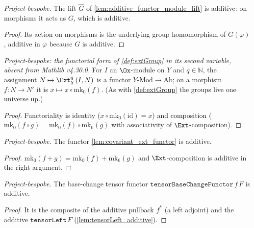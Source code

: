 \begin{lemma}
  \label{lem:lift_additive}
  \textit{Project-bespoke.}
  The lift $\widehat G$ of \cref{lem:additive_functor_module_lift} is additive: on
  morphisms it acts as $G$, which is additive.
  \begin{proof}
    Its action on morphisms is the underlying group homomorphism of $G(\varphi)$,
    additive in $\varphi$ because $G$ is additive.
  \end{proof}
\end{lemma}

\begin{lemma}
  \label{lem:covariant_ext_functor}
  \textit{Project-bespoke: the functorial form of \cref{def:extGroup} in its second
  variable, absent from Mathlib v4.30.0.}
  For $I$ an $\Ox$-module on $Y$ and $q \in \mathbb{N}$, the assignment
  $N \mapsto \Ext^q_Y(I, N)$ is a functor $Y\text{-Mod} \to \mathrm{Ab}$; on a
  morphism $f : N \to N'$ it is $x \mapsto x \circ \mathrm{mk}_0(f)$. (As with
  \cref{def:extGroup} the groups live one universe up.)
  \begin{proof}
    Functoriality is identity ($x\circ\mathrm{mk}_0(\mathrm{id}) = x$) and
    composition ($\mathrm{mk}_0(f\circ g) = \mathrm{mk}_0(f)\circ\mathrm{mk}_0(g)$
    with associativity of $\Ext$-composition).
  \end{proof}
\end{lemma}

\begin{lemma}
  \label{lem:covariant_ext_functor_additive}
  \textit{Project-bespoke.}
  The functor \cref{lem:covariant_ext_functor} is additive.
  \begin{proof}
    $\mathrm{mk}_0(f+g) = \mathrm{mk}_0(f) + \mathrm{mk}_0(g)$ and
    $\Ext$-composition is additive in the right argument.
  \end{proof}
\end{lemma}

\begin{lemma}
  \label{lem:tensor_base_change_additive}
  \textit{Project-bespoke.}
  The base-change tensor functor $\mathtt{tensorBaseChangeFunctor}\,f\,F$ is
  additive.
  \begin{proof}
    It is the composite of the additive pullback $f^*$ (a left adjoint) and the
    additive $\mathtt{tensorLeft}\,F$ (\cref{lem:tensorLeft_additive}).
  \end{proof}
\end{lemma}

